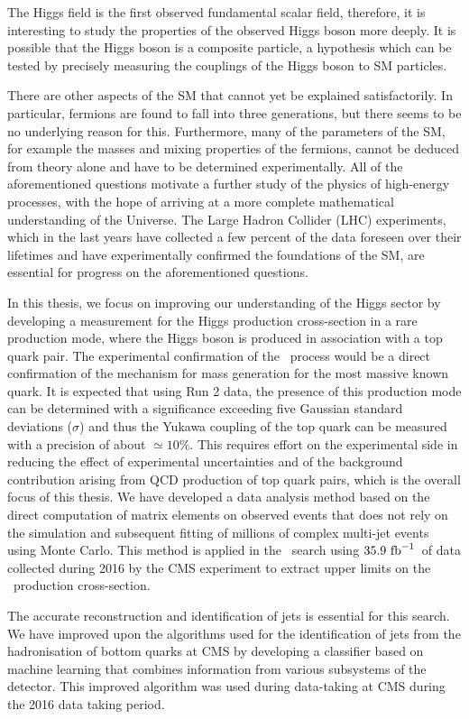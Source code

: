 The Higgs field is the first observed fundamental scalar field, therefore, it is interesting to study the properties of the observed Higgs boson more deeply. It is possible that the Higgs boson is a composite particle, a hypothesis which can be tested by precisely measuring the couplings of the Higgs boson to SM particles.

There are other aspects of the SM that cannot yet be explained satisfactorily. In particular, fermions are found to fall into three generations, but there seems to be no underlying reason for this. Furthermore, many of the parameters of the SM, for example the masses and mixing properties of the fermions, cannot be deduced from theory alone and have to be determined experimentally. All of the aforementioned questions motivate a further study of the physics of high-energy processes, with the hope of arriving at a more complete mathematical understanding of the Universe.
The Large Hadron Collider (LHC) experiments, which in the last years have collected a few percent of the data foreseen over their lifetimes and have experimentally confirmed the foundations of the SM, are essential for progress on the aforementioned questions.

In this thesis, we focus on improving our understanding of the Higgs sector by developing a measurement for the Higgs production cross-section in a rare production mode, where the Higgs boson is produced in association with a top quark pair. The experimental confirmation of the \ttH~process would be a direct confirmation of the mechanism for mass generation for the most massive known quark. It is expected that using Run 2 data, the presence of this production mode can be determined with a significance exceeding five Gaussian standard deviations ($\sigma$) and thus the Yukawa coupling of the top quark can be measured with a precision of about $\simeq10\%$. This requires effort on the experimental side in reducing the effect of experimental uncertainties and of the background contribution arising from QCD production of top quark pairs, which is the overall focus of this thesis. We have developed a data analysis method based on the direct computation of matrix elements on observed events that does not rely on the simulation and subsequent fitting of millions of complex multi-jet events using Monte Carlo. This method is applied in the \ttHbb~search using $35.9~\mathrm{fb}^{-1}$~of data collected during 2016 by the CMS experiment to extract upper limits on the \ttH~production cross-section.

The accurate reconstruction and identification of jets is essential for this search. We have improved upon the algorithms used for the identification of jets from the hadronisation of bottom quarks at CMS by developing a classifier based on machine learning that combines information from various subsystems of the detector. This improved algorithm was used during data-taking at CMS during the 2016 data taking period.

